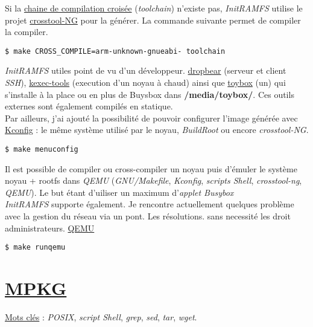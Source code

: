 \documentclass[a4paper]{article}
\begin{document}
Si la \href{https://fr.wikipedia.org/wiki/Cha\%C3\%AEne_de_compilation}{chaine de compilation croisée} (\textit{toolchain}) n'existe pas, \textit{InitRAMFS} utilise le projet \href{http://crosstool-ng.org/}{crosstool-NG} pour la générer. La commande suivante permet de compiler la compiler.
\begin{verbatim}
$ make CROSS_COMPILE=arm-unknown-gnueabi- toolchain
\end{verbatim}

\textit{InitRAMFS} utiles point de vu d'un développeur.
\href{https://matt.ucc.asn.au/dropbear/dropbear.html}{dropbear} (serveur et client \textit{SSH}), \href{http://git.kernel.org/cgit/utils/kernel/kexec/kexec-tools.git/}{kexec-tools} (execution d'un noyau à chaud) ainsi que \href{http://landley.net/toybox/}{toybox} (un) qui s'installe à la place ou en plus de Buysbox dans \textbf{/media/toybox/}. Ces outils externes sont également compilés en statique.\\

Par ailleurs, j'ai ajouté la possibilité de pouvoir configurer l'image générée avec \href{http://ymorin.is-a-geek.org/projects/kconfig-frontends}{Kconfig} : le même système utilisé par le noyau, \textit{BuildRoot} ou encore \textit{crosstool-NG}.
\begin{verbatim}
$ make menuconfig
\end{verbatim}

Il est possible de compiler ou cross-compiler un noyau puis d'émuler le système noyau + rootfs dans \textit{QEMU} (\textit{GNU/Makefile}, \textit{Kconfig}, \textit{scripts Shell}, \textit{crosstool-ng}, \textit{QEMU}).
Le but étant d'uiliser un maximum d'\textit{applet Busybox}\\

\textit{InitRAMFS} supporte également. Je rencontre actuellement quelques problème avec la gestion du réseau via un pont. Les résolutions. sans necessité les droit administrateurs.
\href{http://wiki.qemu.org}{QEMU}
\begin{verbatim}
$ make runqemu
\end{verbatim}

\section{\href{https://github.com/gazoo74/mpkg/}{MPKG}}

\underline{Mots clés} : \textit{POSIX}, \textit{script Shell}, \textit{grep}, \textit{sed}, \textit{tar}, \textit{wget}.
\end{document}
